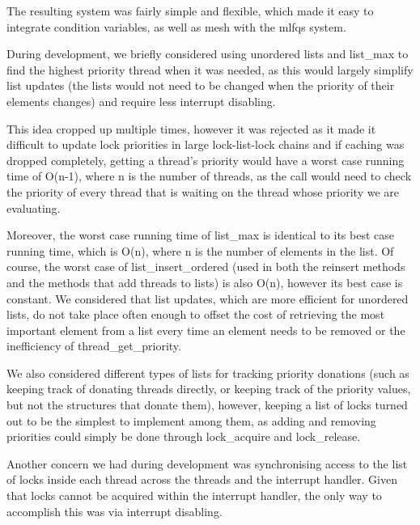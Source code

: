 The resulting system was fairly simple and flexible, which made it easy to integrate condition variables, as well as mesh with the mlfqs system.


During development, we briefly considered using unordered lists and list_max to find the highest priority thread when it was needed, as this would largely simplify list updates (the lists would not need to be changed when the priority of their elements changes) and require less interrupt disabling.

This idea cropped up multiple times, however it was rejected as it made it difficult to update lock priorities in large lock-list-lock chains and if caching was dropped completely, getting a thread's priority would have a worst case running time of O(n-1), where n is the number of threads, as the call would need to check the priority of every thread that is waiting on the thread whose priority we are evaluating.

Moreover, the worst case running time of list_max is identical to its best case running time, which is O(n), where n is the number of elements in the list.
Of course, the worst case of list_insert_ordered (used in both the reinsert methods and the methods that add threads to lists) is also O(n), however its best case is constant.
We considered that list updates, which are more efficient for unordered lists, do not take place often enough to offset the cost of retrieving the most important element from a list every time an element needs to be removed or the inefficiency of thread_get_priority.

We also considered different types of lists for tracking priority donations (such as keeping track of donating threads directly, or keeping track of the priority values, but not the structures that donate them), however, keeping a list of locks turned out to be the simplest to implement among them, as adding and removing priorities could simply be done through lock_acquire and lock_release.

Another concern we had during development was synchronising access to the list of locks inside each thread across the threads and the interrupt handler. Given that locks cannot be acquired within the interrupt handler, the only way to accomplish this was via interrupt disabling.
